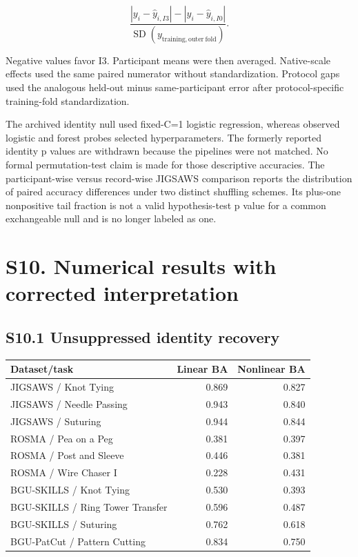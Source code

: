 \documentclass[11pt]{article}
\begin{document}
\[\frac{|y_i-\widehat{y}_{i,I3}|-|y_i-\widehat{y}_{i,I0}|}{\operatorname{SD}(y_{\mathrm{training,outer\ fold}})}.\]

Negative values favor I3. Participant means were then averaged.
Native-scale effects used the same paired numerator without
standardization. Protocol gaps used the analogous held-out minus
same-participant error after protocol-specific training-fold
standardization.

The archived identity null used fixed-C=1 logistic regression, whereas
observed logistic and forest probes selected hyperparameters. The
formerly reported identity p values are withdrawn because the pipelines
were not matched. No formal permutation-test claim is made for those
descriptive accuracies. The participant-wise versus record-wise JIGSAWS
comparison reports the distribution of paired accuracy differences under
two distinct shuffling schemes. Its plus-one nonpositive tail fraction
is not a valid hypothesis-test p value for a common exchangeable null
and is no longer labeled as one.

\section{S10. Numerical results with corrected
interpretation}\label{s10.-numerical-results-with-corrected-interpretation}

\subsection{S10.1 Unsuppressed identity
recovery}\label{s10.1-unsuppressed-identity-recovery}

{\def\LTcaptype{none} %
\begin{longtable}[]{@{}lrr@{}}
\toprule\noalign{}
Dataset/task & Linear BA & Nonlinear BA \\
\midrule\noalign{}
\endhead
\bottomrule\noalign{}
\endlastfoot
JIGSAWS / Knot Tying & 0.869 & 0.827 \\
JIGSAWS / Needle Passing & 0.943 & 0.840 \\
JIGSAWS / Suturing & 0.944 & 0.844 \\
ROSMA / Pea on a Peg & 0.381 & 0.397 \\
ROSMA / Post and Sleeve & 0.446 & 0.381 \\
ROSMA / Wire Chaser I & 0.228 & 0.431 \\
BGU-SKILLS / Knot Tying & 0.530 & 0.393 \\
BGU-SKILLS / Ring Tower Transfer & 0.596 & 0.487 \\
BGU-SKILLS / Suturing & 0.762 & 0.618 \\
BGU-PatCut / Pattern Cutting & 0.834 & 0.750 \\
\end{longtable}
}
\end{document}
